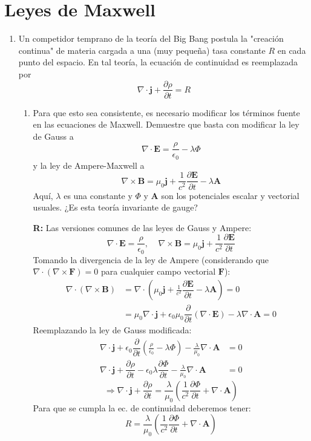 \documentclass[]{article}
\numberwithin{equation}{section}
\newcommand{\0}{\textcolor{gray}{0}}
\newcommand{\di}{\nabla\cdot}
\newcommand{\ro}{\nabla\times}
\newcommand{\eo}{\epsilon_{0}}
\newcommand{\uo}{\mu_{0}}
\newcommand{\pd}[2]{\dfrac{\partial #1}{\partial #2}}
\newcommand{\n}[1]{\mathbf{#1}}
\begin{document}
\section{Leyes de Maxwell}
\begin{enumerate}
	\item Un competidor temprano de la teoría del Big Bang postula la "creación continua" de materia cargada a una (muy pequeña) tasa constante \(R\) en cada punto del espacio. En tal teoría, la ecuación de continuidad es reemplazada por
	\begin{equation*}
		\di\n{j} + \pd{\rho}{t} = R
	\end{equation*}
	\begin{enumerate}
		\item Para que esto sea consistente, es necesario modificar los términos fuente en las ecuaciones de Maxwell. Demuestre que basta con modificar la ley de Gauss a
		\begin{equation*}
			\di\n{E} = \frac{\rho}{\eo} - \lambda\Phi
		\end{equation*}
		y la ley de Ampere-Maxwell a
		\begin{equation*}
			\ro\n{B} = \uo\n{j} + \frac{1}{c^2}\pd{\n{E}}{t} - \lambda\n{A}
		\end{equation*}
		Aquí, \(\lambda\) es una constante y \(\Phi\) y \(\n{A}\) son los potenciales escalar y vectorial usuales. ¿Es esta teoría invariante de gauge?
		
		\textbf{R:} Las versiones comunes de las leyes de Gauss y Ampere:
		\begin{equation*}
			\di\n{E} = \dfrac{\rho}{\eo}, ~~~~~ \ro\n{B} = \uo\n{j} + \frac{1}{c^2}\pd{\n{E}}{t}
		\end{equation*}
		Tomando la divergencia de la ley de Ampere (considerando que \(\di(\ro \n{F}) = 0\) para cualquier campo vectorial \(\n{F}\)):
		\begin{align*}
			\di\left(\ro\n{B}\right) &= \di\left(\uo\n{j} + \frac{1}{c^2}\pd{\n{E}}{t} - \lambda\n{A}\right) = 0\\
			&= \uo\di\n{j} + \eo\uo \pd{}{t}\left(\di\n{E}\right) - \lambda\di\n{A} = 0
		\end{align*}
		Reemplazando la ley de Gauss modificada:
		\begin{align*}
			\di\n{j} + \eo \pd{}{t}\left(\frac{\rho}{\eo} - \lambda\Phi\right) - \frac{\lambda}{\uo}\di\n{A} &= 0\\
			\di\n{j} + \pd{\rho}{t} - \eo \lambda \pd{\Phi}{t} - \frac{\lambda}{\uo}\di\n{A} &= 0
		\end{align*}
		\begin{equation*}
			\Rightarrow \di\n{j} + \pd{\rho}{t} = \frac{\lambda}{\uo}\left(\frac{1}{c^2}\pd{\Phi}{t} + \di\n{A}\right)
		\end{equation*}
		Para que se cumpla la ec. de continuidad deberemos tener:
		\begin{equation*}
			R = \frac{\lambda}{\uo}\left(\frac{1}{c^2}\pd{\Phi}{t} + \di\n{A}\right)
		\end{equation*}
		

\end{enumerate}
\end{enumerate}
\end{document}
